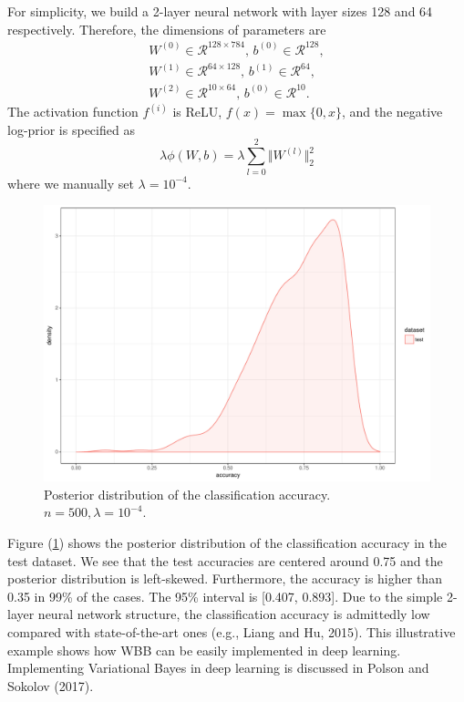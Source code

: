 \documentclass[12pt]{TD-CJS}
\newcommand{\R}{\mathcal{R}}
\begin{document}
For simplicity, we build a 2-layer neural network with layer sizes 128 and 64 respectively. Therefore, the dimensions of parameters are
\begin{align*}
W^{(0)} \in \R^{128\times 784},\, b^{(0)}\in \R^{128},\\
W^{(1)} \in \R^{64\times 128},\, b^{(1)}\in \R^{64},\\
W^{(2)} \in \R^{10\times 64},\, b^{(0)}\in \R^{10}.
\end{align*}
The activation function $f^{(i)}$ is ReLU, $f(x) = \max\{0,x\}$, and the negative log-prior is specified as 
$$
\lambda\phi(W,b) = \lambda\sum_{l=0}^{2}\Vert W^{(l)} \Vert_2^2
$$
where we manually set $\lambda = 10^{-4}$. 
\begin{figure}[!ht]
	\centering
	\includegraphics[width=0.7\linewidth]{acc}
	\caption{Posterior distribution of the classification accuracy. $n=500, \lambda=10^{-4}$.}
	\label{fig:acc}
\end{figure}
Figure (\ref{fig:acc}) shows the posterior distribution of the classification accuracy in the test dataset. We see that the test accuracies are centered around 0.75 and the posterior distribution is left-skewed. Furthermore, the accuracy is higher than 0.35 in 99\% of the cases. The 95\% interval is [0.407, 0.893].  Due to the simple 2-layer neural network structure, the classification accuracy is admittedly low compared with state-of-the-art ones (e.g., Liang and Hu,  2015). This illustrative example shows how WBB can be easily implemented in deep learning. Implementing Variational Bayes in deep learning is discussed in Polson and Sokolov (2017).
\end{document}
